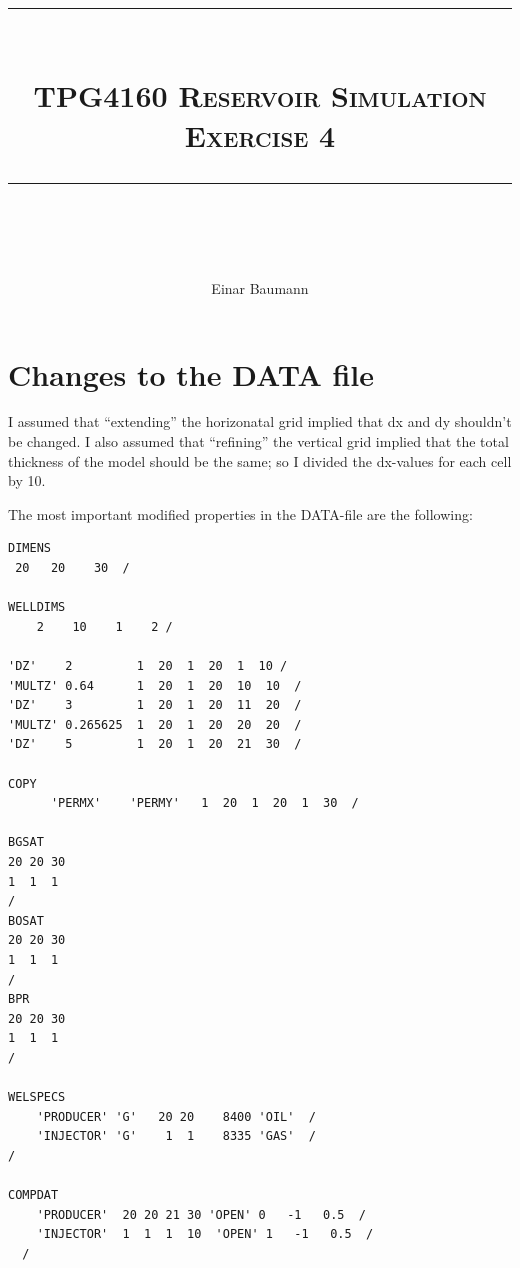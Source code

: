 


\author{Einar Baumann}
\title{
    \vspace{-1in}
    \vspace{0.1in}
    \rule{\textwidth}{0.5pt} \\[0.5cm]
    \normalfont \normalsize \textsc{TPG4160 Reservoir Simulation} \\ [20pt]
    {\textsc{ \huge Exercise 4}} \\
    \vspace{0.1in}
    \rule{\textwidth}{2pt} \\[0.7cm]
}


\maketitle
\thispagestyle{empty}
\clearpage

\section{Changes to the DATA file} %
\label{sec:changes_to_the_data_file}
I assumed that ``extending'' the horizonatal grid implied that dx and dy shouldn't be changed. I also assumed that ``refining'' the vertical grid implied that the total thickness of the model should be the same; so I divided the dx-values for each cell by 10.

The most important modified properties in the DATA-file are the following:

\begin{verbatim}
DIMENS
 20   20    30  /

WELLDIMS
    2    10    1    2 /

'DZ'    2         1  20  1  20  1  10 /
'MULTZ' 0.64      1  20  1  20  10  10  /
'DZ'    3         1  20  1  20  11  20  /
'MULTZ' 0.265625  1  20  1  20  20  20  /
'DZ'    5         1  20  1  20  21  30  /

COPY
      'PERMX'    'PERMY'   1  20  1  20  1  30  /

BGSAT
20 20 30
1  1  1
/
BOSAT
20 20 30
1  1  1
/
BPR
20 20 30
1  1  1
/

WELSPECS
    'PRODUCER' 'G'   20 20    8400 'OIL'  /
    'INJECTOR' 'G'    1  1    8335 'GAS'  /
/

COMPDAT
    'PRODUCER'  20 20 21 30 'OPEN' 0   -1   0.5  /
    'INJECTOR'  1  1  1  10  'OPEN' 1   -1   0.5  /
  /
\end{verbatim}

